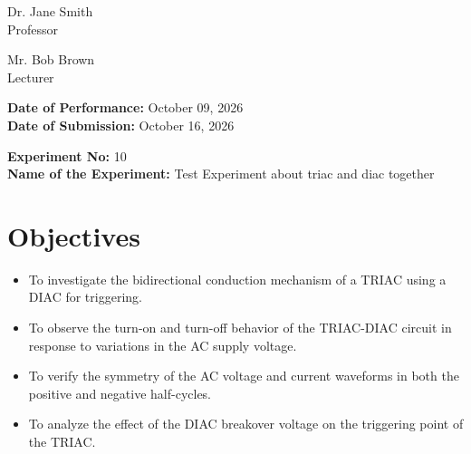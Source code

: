 \documentclass[12pt,a4paper]{article}
\begin{document}
\begin{titlepage}
\begin{minipage}[t]{0.5\textwidth}
\begin{flushright}
            Dr. Jane Smith \\
            Professor \\
            \vspace{0.3cm}
            
            Mr. Bob Brown \\
            Lecturer \\
            
            
        \end{flushright}
    \end{minipage}

    \vfill
    \textbf{Date of Performance:} October 09, 2026 \\
    \textbf{Date of Submission:} October 16, 2026
    
\end{titlepage}

\setcounter{page}{1}
\rmfamily %
\normalsize

\begin{center}
    \textbf{Experiment No:} 10 \\
    \vspace{0.2cm}
    \textbf{Name of the Experiment:} Test Experiment about triac and diac together
\end{center}
\vspace{0.5cm}


\section{Objectives}
\begin{itemize}

    \item To investigate the bidirectional conduction mechanism of a TRIAC using a DIAC for triggering.

    \item To observe the turn-on and turn-off behavior of the TRIAC-DIAC circuit in response to variations in the AC supply voltage.

    \item To verify the symmetry of the AC voltage and current waveforms in both the positive and negative half-cycles.

    \item To analyze the effect of the DIAC breakover voltage on the triggering point of the TRIAC.

\end{itemize}
\end{document}
